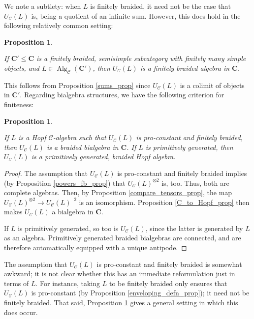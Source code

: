 \documentclass[12pt]{article}
\DeclareMathOperator{\Alg}{Alg}
\DeclareMathOperator{\hattimes}{\widehat{\otimes}}
\newcommand{\CC} {\mathcal{C}}
\newcommand{\bC} {\mathbf{C}}
\theoremstyle{plain}
\newtheorem{prop}[thm]{Proposition}
\theoremstyle{definition}
\theoremstyle{remark}
\begin{document}
We note a subtlety: when $L$ is finitely braided, it need not be the case that $U_{\CC}(L)$ is, being a quotient of an infinite sum.  However, this does hold in the following relatively common setting:

\begin{prop} \label{ss_core_prop}

If $\bC' \leq \bC$ is a finitely braided, semisimple subcategory with finitely many simple objects, and $L \in \Alg_{\CC}(\bC')$, then $U_{\CC}(L)$ is a finitely braided algebra in $\bC$.

\end{prop}

This follows from Proposition \ref{sums_prop} since $U_{\CC}(L)$ is a colimit of objects in $\bC'$.  Regarding bialgebra structures, we have the following criterion for finiteness:

\begin{prop} \label{pc_fb_finite_prop}

If $L$ is a Hopf $\CC$-algebra such that $U_{\CC}(L)$ is pro-constant and finitely braided, then $U_{\CC}(L)$ is a braided bialgebra in $\bC$.  If $L$ is primitively generated, then $U_{\CC}(L)$ is a primitively generated, braided Hopf algebra. 

\end{prop}

\begin{proof}

The assumption that $U_{\CC}(L)$ is pro-constant and finitely braided implies (by Proposition \ref{powers_fb_prop}) that $U_{\CC}(L)^{\otimes 2}$ is, too.  Thus, both are complete algebras.  Then, by Proposition \ref{compare_tensors_prop}, the map $U_{\CC}(L)^{\otimes 2} \to U_{\CC}(L)^{\hattimes 2}$ is an isomorphism.  Proposition \ref{C_to_Hopf_prop} then makes $U_{\CC}(L)$ a bialgebra in $\bC$.

If $L$ is primitively generated, so too is $U_{\CC}(L)$, since the latter is generated by $L$ as an algebra.  Primitively generated braided bialgebras are connected, and are therefore automatically equipped with a unique antipode.


\end{proof}

The assumption that $U_{\CC}(L)$ is pro-constant and finitely braided is somewhat awkward; it is not clear whether this has an immediate reformulation just in terms of $L$.  For instance, taking $L$ to be finitely braided only ensures that $U_{\CC}(L)$ is pro-constant (by Proposition \ref{enveloping_defn_prop}); it need not be finitely braided.  That said, Proposition \ref{ss_core_prop} gives a general setting in which this does occur.
\end{document}
